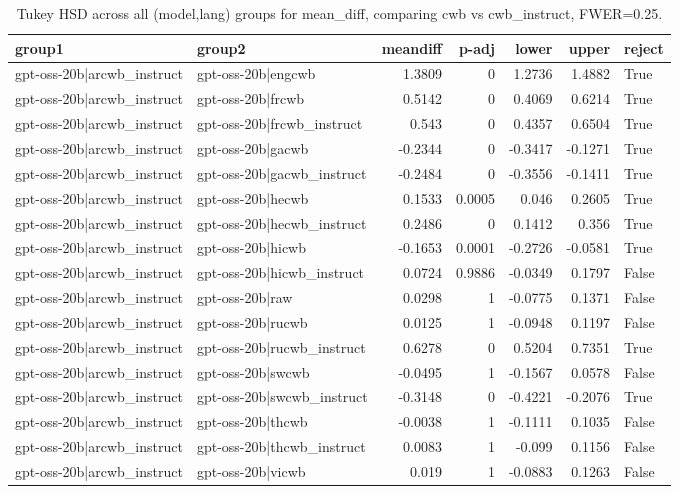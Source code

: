 \begin{table}
\caption{Tukey HSD across all (model,lang) groups for mean_diff, comparing cwb vs cwb_instruct, FWER=0.25.}
\label{tab:tukey_all_models_all_langs_mean_diff_cwb_vs_cwb_instruct}
\begin{tabular}{l l r r r r l}
\toprule
group1 & group2 & meandiff & p-adj & lower & upper & reject \\
\midrule
gpt-oss-20b|arcwb_instruct & gpt-oss-20b|engcwb & 1.3809 & 0 & 1.2736 & 1.4882 & True \\
gpt-oss-20b|arcwb_instruct & gpt-oss-20b|frcwb & 0.5142 & 0 & 0.4069 & 0.6214 & True \\
gpt-oss-20b|arcwb_instruct & gpt-oss-20b|frcwb_instruct & 0.543 & 0 & 0.4357 & 0.6504 & True \\
gpt-oss-20b|arcwb_instruct & gpt-oss-20b|gacwb & -0.2344 & 0 & -0.3417 & -0.1271 & True \\
gpt-oss-20b|arcwb_instruct & gpt-oss-20b|gacwb_instruct & -0.2484 & 0 & -0.3556 & -0.1411 & True \\
gpt-oss-20b|arcwb_instruct & gpt-oss-20b|hecwb & 0.1533 & 0.0005 & 0.046 & 0.2605 & True \\
gpt-oss-20b|arcwb_instruct & gpt-oss-20b|hecwb_instruct & 0.2486 & 0 & 0.1412 & 0.356 & True \\
gpt-oss-20b|arcwb_instruct & gpt-oss-20b|hicwb & -0.1653 & 0.0001 & -0.2726 & -0.0581 & True \\
gpt-oss-20b|arcwb_instruct & gpt-oss-20b|hicwb_instruct & 0.0724 & 0.9886 & -0.0349 & 0.1797 & False \\
gpt-oss-20b|arcwb_instruct & gpt-oss-20b|raw & 0.0298 & 1 & -0.0775 & 0.1371 & False \\
gpt-oss-20b|arcwb_instruct & gpt-oss-20b|rucwb & 0.0125 & 1 & -0.0948 & 0.1197 & False \\
gpt-oss-20b|arcwb_instruct & gpt-oss-20b|rucwb_instruct & 0.6278 & 0 & 0.5204 & 0.7351 & True \\
gpt-oss-20b|arcwb_instruct & gpt-oss-20b|swcwb & -0.0495 & 1 & -0.1567 & 0.0578 & False \\
gpt-oss-20b|arcwb_instruct & gpt-oss-20b|swcwb_instruct & -0.3148 & 0 & -0.4221 & -0.2076 & True \\
gpt-oss-20b|arcwb_instruct & gpt-oss-20b|thcwb & -0.0038 & 1 & -0.1111 & 0.1035 & False \\
gpt-oss-20b|arcwb_instruct & gpt-oss-20b|thcwb_instruct & 0.0083 & 1 & -0.099 & 0.1156 & False \\
gpt-oss-20b|arcwb_instruct & gpt-oss-20b|vicwb & 0.019 & 1 & -0.0883 & 0.1263 & False \\

\end{tabular}
\end{table}
